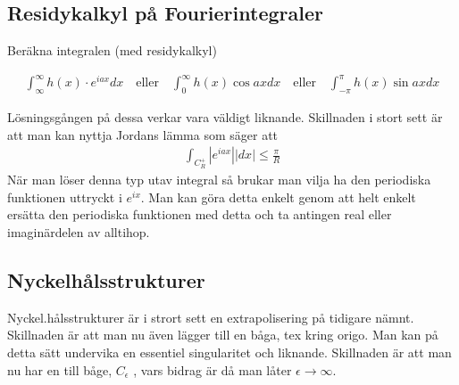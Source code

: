 \subsection{Residykalkyl på Fourierintegraler}


\begin{tcolorbox}
Beräkna integralen (med residykalkyl)

\begin{align*}
	\int_{\infty}^{\infty} h(x) \cdot e^{iax} dx \quad \text{eller} \quad \int_{0}^{\infty} h(x) \cos{ax} dx \quad \text{eller} \quad  \int_{-\pi}^{\pi} h(x) \sin{ax} dx
\end{align*}
\end{tcolorbox}

Lösningsgången på dessa verkar vara väldigt liknande. Skillnaden i stort sett är att man kan nyttja Jordans lämma som säger att
\begin{align*}
	\int_{C_R^+} |e^{iax}| |dx| \leq \frac{\pi}{R}
\end{align*}
När man löser denna typ utav integral så brukar man vilja ha den periodiska funktionen uttryckt i $e^{i x}$. Man kan göra detta enkelt genom att helt enkelt ersätta den periodiska funktionen med detta och ta antingen real eller imaginärdelen av alltihop. 

\subsection{Nyckelhålsstrukturer}
Nyckel.hålsstrukturer är i strort sett en extrapolisering på tidigare nämnt. Skillnaden är att man nu även lägger till en båga, tex kring origo. Man kan på detta sätt undervika en essentiel singularitet och liknande. Skillnaden är att man nu har en till båge, $C_\epsilon$ , vars bidrag är då man låter $\epsilon \rightarrow \infty$.








